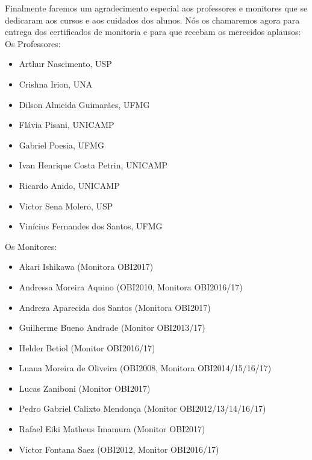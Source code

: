 \documentclass{article}
\begin{document}
Finalmente faremos um agradecimento especial aos professores e monitores que se dedicaram aos cursos e aos cuidados dos alunos.
Nós os chamaremos agora para entrega dos certificados de monitoria e para que recebam os merecidos aplausos:\\

Os Professores:

\begin{itemize}
\item Arthur Nascimento, USP
\item Crishna Irion, UNA
\item Dilson Almeida Guimarães, UFMG
\item Flávia Pisani, UNICAMP
\item Gabriel Poesia, UFMG
\item Ivan Henrique Costa Petrin, UNICAMP
\item Ricardo Anido, UNICAMP
\item Victor Sena Molero, USP
\item Vinícius Fernandes dos Santos, UFMG
\end{itemize}

Os Monitores:

\begin{itemize}
\item Akari Ishikawa (Monitora OBI2017)
\item Andressa Moreira Aquino (OBI2010, Monitora OBI2016/17)
\item Andreza Aparecida dos Santos (Monitora OBI2017)
\item Guilherme Bueno Andrade (Monitor OBI2013/17)
\item Helder Betiol (Monitor OBI2016/17)
\item Luana Moreira de Oliveira (OBI2008, Monitora OBI2014/15/16/17)
\item Lucas Zaniboni (Monitor OBI2017)
\item Pedro Gabriel Calixto Mendonça (Monitor OBI2012/13/14/16/17)
\item Rafael Eiki Matheus Imamura (Monitor OBI2017)
\item Victor Fontana Saez (OBI2012, Monitor OBI2016/17)
\end{itemize}
\end{document}
